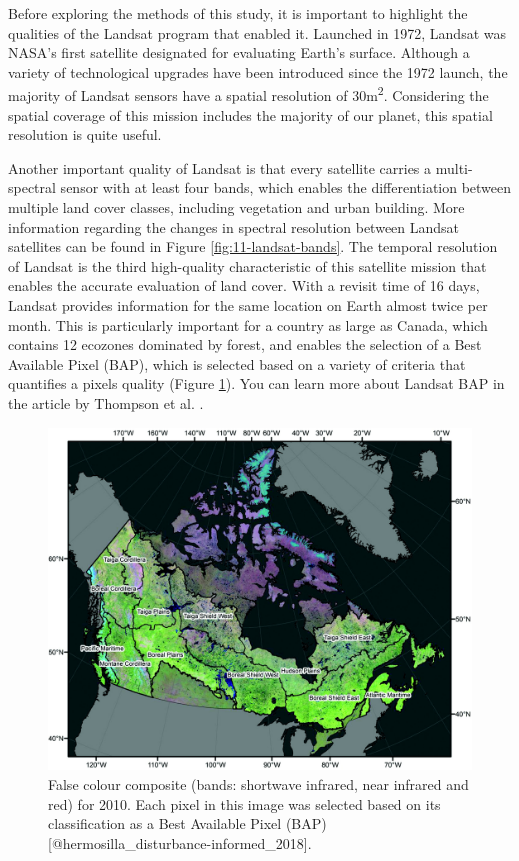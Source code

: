 \documentclass[
]{book}
\begin{document}
Before exploring the methods of this study, it is important to highlight the qualities of the Landsat program that enabled it. Launched in 1972, Landsat was NASA's first satellite designated for evaluating Earth's surface. Although a variety of technological upgrades have been introduced since the 1972 launch, the majority of Landsat sensors have a spatial resolution of 30m\textsuperscript{2}. Considering the spatial coverage of this mission includes the majority of our planet, this spatial resolution is quite useful.

Another important quality of Landsat is that every satellite carries a multi-spectral sensor with at least four bands, which enables the differentiation between multiple land cover classes, including vegetation and urban building. More information regarding the changes in spectral resolution between Landsat satellites can be found in Figure \ref{fig:11-landsat-bands}. The temporal resolution of Landsat is the third high-quality characteristic of this satellite mission that enables the accurate evaluation of land cover. With a revisit time of 16 days, Landsat provides information for the same location on Earth almost twice per month. This is particularly important for a country as large as Canada, which contains 12 ecozones dominated by forest, and enables the selection of a Best Available Pixel (BAP), which is selected based on a variety of criteria that quantifies a pixels quality (Figure \ref{fig:11-hermo-false}). You can learn more about Landsat BAP in the article by Thompson et al. \citep{thompson_mapping_2015}.

\begin{figure}
\includegraphics[width=0.9\linewidth]{images/11-hermosilla-false-colour} \caption{False colour composite (bands: shortwave infrared, near infrared and red) for 2010. Each pixel in this image was selected based on its classification as a Best Available Pixel (BAP) [@hermosilla_disturbance-informed_2018].}\label{fig:11-hermo-false}
\end{figure}
\end{document}
